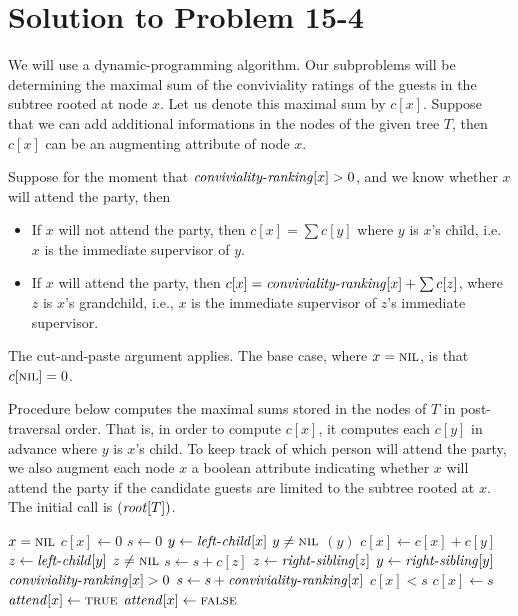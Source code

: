 \documentclass[a4paper, fleqn]{article}
\begin{document}
\section*{Solution to Problem 15-4}

We will use a dynamic-programming algorithm. Our subproblems will be
determining the maximal sum of the conviviality ratings of the guests
in the subtree rooted at node $x$. Let us denote this maximal sum by
$c[x]$. Suppose that we can add additional informations in the nodes
of the given tree $T$, then $c[x]$ can be an augmenting attribute of
node $x$.

Suppose for the moment that $\id{conviviality-ranking}[x] > 0$, and we
know whether $x$ will attend the party, then

\begin{itemize}
\item
If $x$ will not attend the party, then $c[x] = \sum c[y]$ where $y$ is
$x$'s child, i.e. $x$ is the immediate supervisor of $y$.

\item

If $x$ will attend the party, then $c[x] =
\id{conviviality-ranking}[x] + \sum c[z]$, where $z$ is $x$'s
grandchild, i.e., $x$ is the immediate supervisor of $z$'s immediate
supervisor.  \end{itemize}

The cut-and-paste argument applies. The base case, where $x =
\textnormal{\scshape nil}$, is that $c[\textnormal{\scshape nil}] = 0$.

Procedure  below computes the maximal sums stored
in the nodes of $T$ in post-traversal order. That is, in order to
compute $c[x]$, it computes each $c[y]$ in advance where $y$ is $x$'s
child. To keep track of which person will attend the party, we also
augment each node $x$ a boolean attribute  indicating
whether $x$ will attend the party if the candidate guests are limited
to the subtree rooted at $x$.  The initial call is
$(\id{root}[T])$.

\begin{codebox}
\li \If $x = \textnormal{\scshape nil}$
\li   \Then \Return
      \End
\li $c[x] \gets 0$
\li $s \gets 0$
\li $y \gets \id{left-child}[x]$
\li \While $y \neq \textnormal{\scshape nil}$
\li   \Do
        $(y)$
\li     $c[x] \gets c[x] + c[y]$
\li     $z \gets \id{left-child}[y]$
\li     \While $z \neq \textnormal{\scshape nil}$
\li       \Do
            $s \gets s + c[z]$
\li         $z \gets \id{right-sibling}[z]$
          \End  
\li     $y \gets \id{right-sibling}[y]$
      \End
\li \If $\id{conviviality-ranking}[x] > 0$
\li   \Then
        $s \gets s + \id{conviviality-ranking}[x]$
      \End
\li \If $c[x] < s$
\li   \Then
        $c[x] \gets s$
\li     $\id{attend}[x] \gets \const{true}$
\li   \Else
        $\id{attend}[x] \gets \const{false}$
      \End
\end{codebox}
\end{document}
